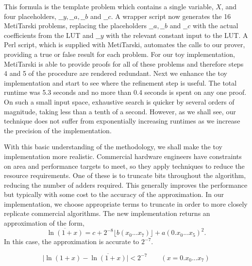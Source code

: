 \documentclass{fac}
\newcommand{\abs}[1]{\lvert#1\rvert}
\begin{document}
This formula is the template problem which contains a single variable, $X$, and four placeholders, $\_\_y, \_\_a, \_\_b$ and $\_\_c$.
A wrapper script now generates the 16 MetiTarski problems, replacing the placeholders $\_\_a, \_\_b$ and $\_\_c$ with the actual coefficients from the LUT and $\_\_y$ with the relevant constant input to the LUT. A Perl script, which is supplied with MetiTarski, automates the calls to our prover, providing a true or false result for each problem. For our toy implementation, MetiTarski is able to provide proofs for all of these problems and therefore steps 4 and 5 of the procedure are rendered redundant. Next we enhance the toy implementation and start to see where the refinement step is useful. The total runtime was 5.3 seconds and no more than 0.4 seconds is spent on any one proof. On such a small input space, exhaustive search is quicker by several orders of magnitude, taking less than a tenth of a second. However, as we shall see, our technique does not suffer from exponentially increasing runtimes as we increase the precision of the implementation. 

With this basic understanding of the methodology, we shall make the toy implementation more realistic. Commercial hardware engineers have constraints on area and performance targets to meet, so they apply techniques to reduce the resource requirements. One of these is to truncate bits throughout the algorithm, reducing the number of adders required. This generally improves the performance but typically with some cost to the accuracy of the approximation. In our implementation, we choose appropriate terms to truncate in order to more closely replicate commercial algorithms. The new implementation returns an approximation of the form, 
\begin{equation} \label{update_toy}
\overline{\ln(1+x)}=c + 2^{-8} \lfloor{b(x_0...x_7)} \rfloor +a(0.x_0...x_5)^2. 
\end{equation}
In this case, the approximation is accurate to $2^{-7}$.

\[ \abs{\ln(1+x)-\overline{\ln(1+x)}} <2^{-7} \qquad (x= 0.x_0...x_7) \]
\end{document}
